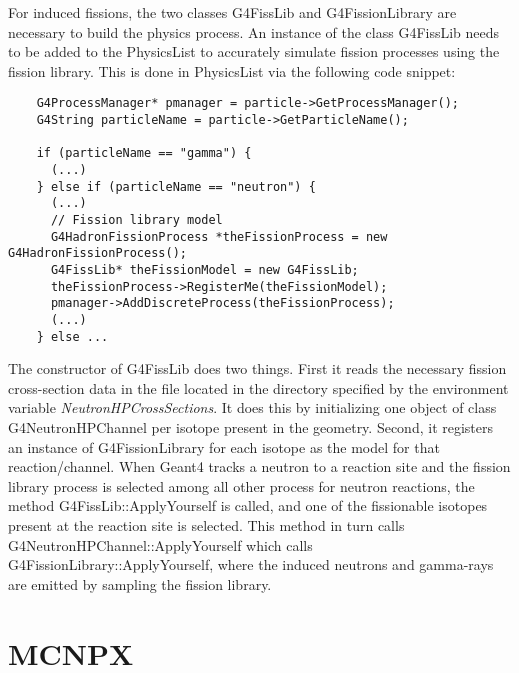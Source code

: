\documentclass[fleqn,11pt]{article}
\begin{document}
For induced fissions, the two classes G4FissLib and 
G4FissionLibrary are necessary to build the physics
process. An instance of the class G4FissLib 
needs to be added to the PhysicsList to accurately simulate
fission processes using the fission library. This is done
in PhysicsList via the following code snippet:

\begin{verbatim}
    G4ProcessManager* pmanager = particle->GetProcessManager();
    G4String particleName = particle->GetParticleName();

    if (particleName == "gamma") {
      (...)
    } else if (particleName == "neutron") {
      (...)
      // Fission library model
      G4HadronFissionProcess *theFissionProcess = new G4HadronFissionProcess();
      G4FissLib* theFissionModel = new G4FissLib;
      theFissionProcess->RegisterMe(theFissionModel);
      pmanager->AddDiscreteProcess(theFissionProcess);
      (...)
    } else ...
\end{verbatim}

The constructor of G4FissLib does two things. First it reads 
the necessary fission cross-section data in the file located 
in the directory specified by the environment variable 
\textit{NeutronHPCrossSections}. It does this by initializing
one object of class G4NeutronHPChannel per isotope present 
in the geometry. Second, it registers an instance of 
G4FissionLibrary for each isotope as the model for that
reaction/channel. When Geant4 tracks a neutron to a reaction
site and the fission library process is selected among all 
other process for neutron reactions, the method 
G4FissLib::ApplyYourself is called, and one of the 
fissionable isotopes present at the reaction site is 
selected. This method in turn calls 
G4NeutronHPChannel::ApplyYourself which calls
G4FissionLibrary::ApplyYourself, where the induced neutrons
and gamma-rays are emitted by sampling the fission library.


\pagebreak
\section{MCNPX}
\end{document}
